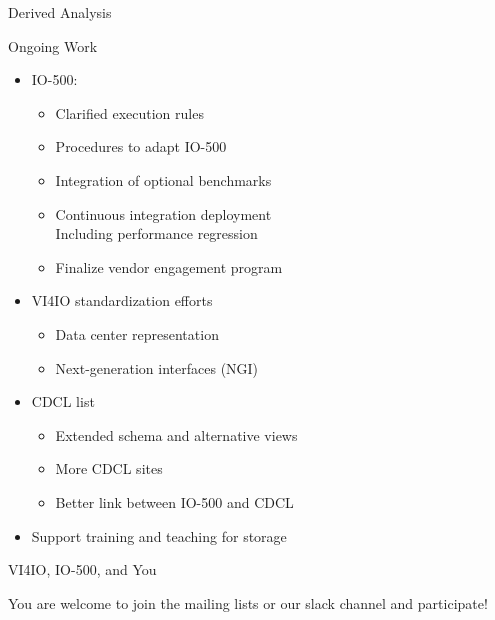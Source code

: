 \documentclass[portrait,a0paper,fontscale=0.4]{baposter}
\newcommand{\compresslist}{%
\setlength{\itemsep}{1pt}%
\setlength{\parskip}{0pt}%
\setlength{\parsep}{0pt}%
}
\begin{document}
\begin{poster}
\begin{posterbox}[name=awareness,column=3,below=engineering]{Derived Analysis}
\end{posterbox}

\begin{posterbox}[name=b4,column=3,below=awareness]{Ongoing Work}
\begin{itemize}\compresslist
\item IO-500:
  \begin{itemize}
  \item Clarified execution rules
  \item Procedures to adapt IO-500
  \item Integration of optional benchmarks
  \item Continuous integration deployment \\
        Including performance regression
  \item Finalize vendor engagement program
  \end{itemize}
\item VI4IO standardization efforts
  \begin{itemize}\compresslist
  \item Data center representation
  \item Next-generation interfaces (NGI)
  \end{itemize}
\item CDCL list
  \begin{itemize}\compresslist
  \item Extended schema and alternative views
  \item More CDCL sites
  \item Better link between IO-500 and CDCL
  \end{itemize}
\item Support training and teaching for storage
\end{itemize}
\end{posterbox}


\begin{posterbox}[name=hpccertification,column=3,below=b4, above=bottom]{VI4IO, IO-500, and You}


You are welcome to join the mailing lists or our slack channel and participate!



\end{posterbox}
\end{poster}
\end{document}
